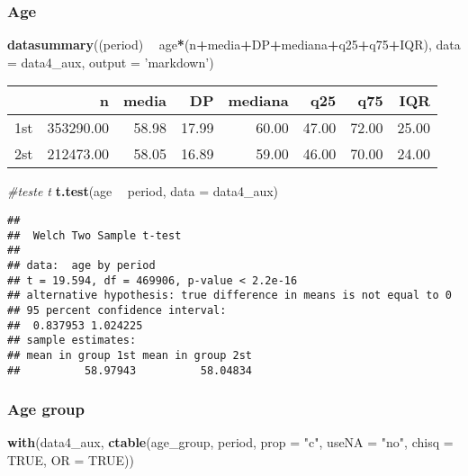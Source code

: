 \documentclass[
]{article}
\newenvironment{Shaded}{\begin{snugshade}}{\end{snugshade}}
\newcommand{\CommentTok}[1]{\textcolor[rgb]{0.56,0.35,0.01}{\textit{#1}}}
\newcommand{\DataTypeTok}[1]{\textcolor[rgb]{0.13,0.29,0.53}{#1}}
\newcommand{\KeywordTok}[1]{\textcolor[rgb]{0.13,0.29,0.53}{\textbf{#1}}}
\newcommand{\NormalTok}[1]{#1}
\newcommand{\OperatorTok}[1]{\textcolor[rgb]{0.81,0.36,0.00}{\textbf{#1}}}
\newcommand{\OtherTok}[1]{\textcolor[rgb]{0.56,0.35,0.01}{#1}}
\newcommand{\StringTok}[1]{\textcolor[rgb]{0.31,0.60,0.02}{#1}}
\begin{document}
\hypertarget{age-1}{%
\subsubsection{Age}\label{age-1}}

\begin{Shaded}
\begin{Highlighting}[]
\KeywordTok{datasummary}\NormalTok{((period) }\OperatorTok{~}\StringTok{ }\NormalTok{age}\OperatorTok{*}\NormalTok{(n}\OperatorTok{+}\NormalTok{media}\OperatorTok{+}\NormalTok{DP}\OperatorTok{+}\NormalTok{mediana}\OperatorTok{+}\NormalTok{q25}\OperatorTok{+}\NormalTok{q75}\OperatorTok{+}\NormalTok{IQR),}
            \DataTypeTok{data =}\NormalTok{ data4_aux, }\DataTypeTok{output =} \StringTok{'markdown'}\NormalTok{)}
\end{Highlighting}
\end{Shaded}

\begin{longtable}[]{@{}lrrrrrrr@{}}
\toprule
& n & media & DP & mediana & q25 & q75 & IQR\tabularnewline
\midrule
\endhead
1st & 353290.00 & 58.98 & 17.99 & 60.00 & 47.00 & 72.00 &
25.00\tabularnewline
2st & 212473.00 & 58.05 & 16.89 & 59.00 & 46.00 & 70.00 &
24.00\tabularnewline
\bottomrule
\end{longtable}

\begin{Shaded}
\begin{Highlighting}[]
\CommentTok{#teste t}
\KeywordTok{t.test}\NormalTok{(age }\OperatorTok{~}\StringTok{ }\NormalTok{period, }\DataTypeTok{data =}\NormalTok{ data4_aux)}
\end{Highlighting}
\end{Shaded}

\begin{verbatim}
## 
##  Welch Two Sample t-test
## 
## data:  age by period
## t = 19.594, df = 469906, p-value < 2.2e-16
## alternative hypothesis: true difference in means is not equal to 0
## 95 percent confidence interval:
##  0.837953 1.024225
## sample estimates:
## mean in group 1st mean in group 2st 
##          58.97943          58.04834
\end{verbatim}

\hypertarget{age-group-1}{%
\subsubsection{Age group}\label{age-group-1}}

\begin{Shaded}
\begin{Highlighting}[]
\KeywordTok{with}\NormalTok{(data4_aux, }\KeywordTok{ctable}\NormalTok{(age_group, period, }\DataTypeTok{prop =} \StringTok{"c"}\NormalTok{, }\DataTypeTok{useNA =} \StringTok{"no"}\NormalTok{, }\DataTypeTok{chisq =} \OtherTok{TRUE}\NormalTok{, }\DataTypeTok{OR =} \OtherTok{TRUE}\NormalTok{))}
\end{Highlighting}
\end{Shaded}
\end{document}
